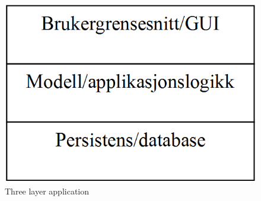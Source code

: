 \begin{figure}[H]
    \centering
    \includegraphics[scale=0.35]{resources/three-layer-application.PNG}
    \caption{Three layer application}
    \label{fig:three-layer-application}
\end{figure}

